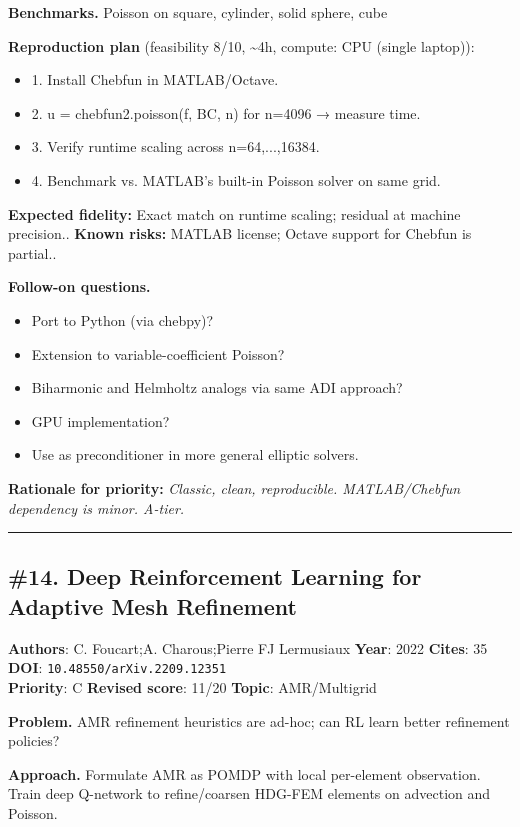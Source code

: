 \documentclass[10pt,letterpaper]{article}
\begin{document}
\textbf{Benchmarks.} Poisson on square, cylinder, solid sphere, cube

\textbf{Reproduction plan} (feasibility 8/10, \textasciitilde4h, compute: CPU (single laptop)):
\begin{itemize}
\item 1. Install Chebfun in MATLAB/Octave.
\item 2. u = chebfun2.poisson(f, BC, n) for n=4096 → measure time.
\item 3. Verify runtime scaling across n=64,...,16384.
\item 4. Benchmark vs. MATLAB's built-in Poisson solver on same grid.
\end{itemize}
\textbf{Expected fidelity:} Exact match on runtime scaling; residual at machine precision.. \textbf{Known risks:} MATLAB license; Octave support for Chebfun is partial..

\textbf{Follow-on questions.}
\begin{itemize}
\item Port to Python (via chebpy)?
\item Extension to variable-coefficient Poisson?
\item Biharmonic and Helmholtz analogs via same ADI approach?
\item GPU implementation?
\item Use as preconditioner in more general elliptic solvers.
\end{itemize}

\textbf{Rationale for priority:} \emph{Classic, clean, reproducible. MATLAB/Chebfun dependency is minor. A-tier.}

\medskip\hrule\medskip

\subsection*{\#14. Deep Reinforcement Learning for Adaptive Mesh Refinement}
\textbf{Authors}: C. Foucart;A. Charous;Pierre FJ Lermusiaux \textbullet{} \textbf{Year}: 2022 \textbullet{} \textbf{Cites}: 35 \textbullet{} \textbf{DOI}: \texttt{10.48550/arXiv.2209.12351} \\
\textbf{Priority}: C \textbullet{} \textbf{Revised score}: 11/20 \textbullet{} \textbf{Topic}: AMR/Multigrid

\textbf{Problem.} AMR refinement heuristics are ad-hoc; can RL learn better refinement policies?

\textbf{Approach.} Formulate AMR as POMDP with local per-element observation. Train deep Q-network to refine/coarsen HDG-FEM elements on advection and Poisson.
\end{document}
